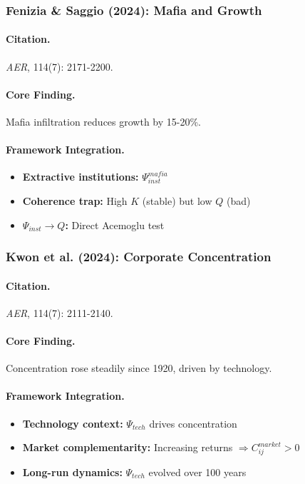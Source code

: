 \documentclass[12pt,a4paper]{article}
\begin{document}
\subsubsection{Fenizia \& Saggio (2024): Mafia and Growth}

\paragraph{Citation.}
\emph{AER}, 114(7): 2171-2200.

\paragraph{Core Finding.}
Mafia infiltration reduces growth by 15-20\%.

\paragraph{Framework Integration.}
\begin{itemize}
  \item \textbf{Extractive institutions:} $\Psi_{inst}^{mafia}$
  \item \textbf{Coherence trap:} High $K$ (stable) but low $Q$ (bad)
  \item \textbf{$\Psi_{inst} \to Q$:} Direct Acemoglu test
\end{itemize}

\subsubsection{Kwon et al. (2024): Corporate Concentration}

\paragraph{Citation.}
\emph{AER}, 114(7): 2111-2140.

\paragraph{Core Finding.}
Concentration rose steadily since 1920, driven by technology.

\paragraph{Framework Integration.}
\begin{itemize}
  \item \textbf{Technology context:} $\Psi_{tech}$ drives concentration
  \item \textbf{Market complementarity:} Increasing returns $\Rightarrow C_{ij}^{market} > 0$
  \item \textbf{Long-run dynamics:} $\Psi_{tech}$ evolved over 100 years
\end{itemize}
\end{document}
